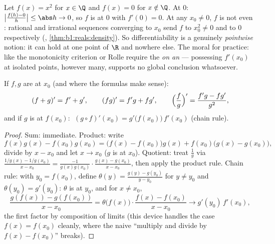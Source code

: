 \begin{example}\label{ex:b1:derivative:onepoint}
Let $f(x) = x^2$ for $x \in \Q$ and $f(x) = 0$ for $x \notin
\Q$. At $0$: $\bigl|\frac{f(h) - 0}{h}\bigr| \leq \abs h \to 0$,
so $f$ is  at $0$ with $f'(0) = 0$. At any $x_0
\neq 0$, $f$ is not even : rational and irrational
sequences converging to $x_0$ send $f$ to $x_0^2 \neq 0$ and to
$0$ respectively (, \cref{thm:b1:reals:density}). So
differentiability is a genuinely \emph{pointwise} notion: it can
hold at one point of $\R$ and nowhere else. The moral for
practice:  like the monotonicity criterion or Rolle
require the  \emph{on an } --- possessing
$f'(x_0)$ at isolated points, however many, supports no global
conclusion whatsoever.
\end{example}

\begin{theorem}[Operations]\label{thm:b1:derivative:operations}
If $f, g$ are  at $x_0$ (and where the formulas make
sense):
\[
(f + g)' = f' + g', \qquad
(fg)' = f'g + fg', \qquad
\Bigl(\frac fg\Bigr)' = \frac{f'g - fg'}{g^2},
\]
and if $g$ is  at $f(x_0)$:
$\;(g \circ f)'(x_0) = g'\bigl(f(x_0)\bigr)\, f'(x_0)$ (chain
rule).
\end{theorem}

\begin{proof}
Sum: immediate. Product: write
\[
f(x)g(x) - f(x_0)g(x_0)
= \bigl(f(x) - f(x_0)\bigr) g(x) + f(x_0)\bigl(g(x) - g(x_0)\bigr),
\]
divide by $x - x_0$ and let $x \to x_0$ ($g$ is  at $x_0$).
Quotient: treat $\frac 1g$ via $\frac{1/g(x) - 1/g(x_0)}{x - x_0} =
\frac{-1}{g(x)g(x_0)}\cdot\frac{g(x) - g(x_0)}{x - x_0}$, then apply
the product rule. Chain rule: with $y_0 = f(x_0)$, define
$\theta(y) = \frac{g(y) - g(y_0)}{y - y_0}$ for $y \neq y_0$ and
$\theta(y_0) = g'(y_0)$: $\theta$ is  at $y_0$, and for
$x \neq x_0$,
\[
\frac{g(f(x)) - g(f(x_0))}{x - x_0}
= \theta\bigl(f(x)\bigr)\cdot \frac{f(x) - f(x_0)}{x - x_0}
\longrightarrow g'(y_0)\, f'(x_0),
\]
the first factor by composition of limits (this device handles the
case $f(x) = f(x_0)$ cleanly, where the naive ``multiply and divide
by $f(x) - f(x_0)$'' breaks).
\end{proof}

